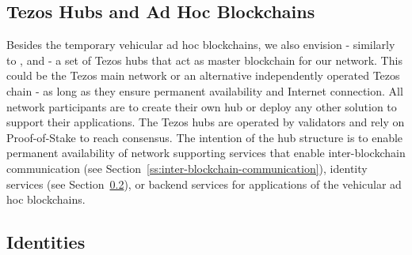 \documentclass{llncs}
\begin{document}
{		%
		
		\subsection{Tezos Hubs and Ad Hoc Blockchains}
			\label{ss:blockchain-hubs}
			
			Besides the temporary vehicular ad hoc blockchains, we also envision - similarly to  \cite{monetWhitepaper}, \cite{cosmosWhitepaper} and \cite{chorus2018MCIS}- a set of Tezos hubs that act as master blockchain for our network. This could be the Tezos main network or an alternative independently operated Tezos chain - as long as they ensure permanent availability and Internet connection. All network participants are to create their own hub or deploy any other solution to support their applications. The Tezos hubs are operated by validators and rely on Proof-of-Stake to reach consensus. The intention of the hub structure is to enable permanent availability of network supporting services that enable inter-blockchain communication (see Section~\ref{ss:inter-blockchain-communication}), identity services (see Section~\ref{ss:identities}), or backend services for applications of the vehicular ad hoc blockchains.
			

		\subsection{Identities}
			\label{ss:identities}
		
}
\end{document}
